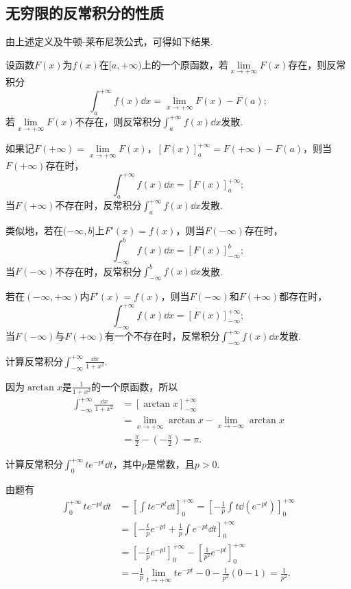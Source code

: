 \subsection{无穷限的反常积分的性质}
由上述定义及牛顿-莱布尼茨公式，可得如下结果.
\begin{theorem}\label{theorem:定积分.利用牛顿莱布尼茨公式计算无穷限的反常积分}
设函数\(F(x)\)为\(f(x)\)在\([a,+\infty)\)上的一个原函数，若\(\lim\limits_{x \to +\infty} F(x)\)存在，则反常积分\[
\int_a^{+\infty} f(x) \dd{x} = \lim\limits_{x \to +\infty} F(x) - F(a);
\]若\(\lim\limits_{x\to+\infty} F(x)\)不存在，则反常积分\(\int_a^{+\infty} f(x) \dd{x}\)发散.

如果记\(F(+\infty)=\lim\limits_{x \to +\infty} F(x)\)，\([F(x)]_a^{+\infty} = F(+\infty) - F(a)\)，则当\(F(+\infty)\)存在时，\[
\int_a^{+\infty} f(x) \dd{x} = [F(x)]_a^{+\infty};
\]当\(F(+\infty)\)不存在时，反常积分\(\int_a^{+\infty} f(x) \dd{x}\)发散.

类似地，若在\((-\infty,b]\)上\(F'(x)=f(x)\)，则当\(F(-\infty)\)存在时，\[
\int_{-\infty}^b f(x) \dd{x} = [F(x)]_{-\infty}^b;
\]当\(F(-\infty)\)不存在时，反常积分\(\int_{-\infty}^b f(x) \dd{x}\)发散.

若在\((-\infty,+\infty)\)内\(F'(x)=f(x)\)，则当\(F(-\infty)\)和\(F(+\infty)\)都存在时，\[
\int_{-\infty}^{+\infty} f(x) \dd{x} = [F(x)]_{-\infty}^{+\infty};
\]当\(F(-\infty)\)与\(F(+\infty)\)有一个不存在时，反常积分\(\int_{-\infty}^{+\infty} f(x) \dd{x}\)发散.
\end{theorem}

\begin{example}
计算反常积分\(\int_{-\infty}^{+\infty} \frac{\dd{x}}{1+x^2}\).
\begin{solution}
因为\(\arctan x\)是\(\frac{1}{1+x^2}\)的一个原函数，所以\[
\begin{split}
\int_{-\infty}^{+\infty} \frac{\dd{x}}{1+x^2}
&= [\arctan x]_{-\infty}^{+\infty} \\
&= \lim\limits_{x\to+\infty} \arctan x
	-\lim\limits_{x\to-\infty} \arctan x \\
&= \frac{\pi}{2} - \left(-\frac{\pi}{2}\right) = \pi.
\end{split}
\]
\end{solution}
\end{example}

\begin{example}
计算反常积分\(\int_0^{+\infty} t e^{-pt} \dd{t}\)，其中\(p\)是常数，且\(p>0\).
\begin{solution}
由题有\begin{align*}
\int_0^{+\infty} t e^{-pt} \dd{t}
&= \left[ \int t e^{-pt} \dd{t} \right]_0^{+\infty}
= \left[ -\frac{1}{p} \int t \dd(e^{-pt}) \right]_0^{+\infty} \\
&= \left[ -\frac{t}{p} e^{-pt} + \frac{1}{p} \int e^{-pt} \dd{t} \right]_0^{+\infty} \\
&= \left[ -\frac{t}{p} e^{-pt} \right]_0^{+\infty} - \left[ \frac{1}{p^2} e^{-pt} \right]_0^{+\infty} \\
&= -\frac{1}{p} \lim\limits_{t\to+\infty} t e^{-pt} - 0 - \frac{1}{p^2}(0-1) = \frac{1}{p^2}.
\end{align*}
\end{solution}
\end{example}

